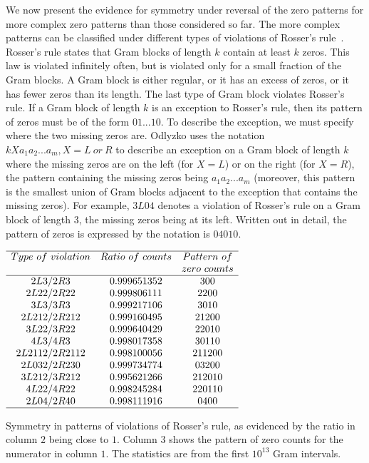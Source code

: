 \documentclass[twoside]{article}
\theoremstyle{definition}
\begin{document}
{We now present the evidence for symmetry under reversal of the zero patterns for more complex zero patterns than those considered so far. The more complex patterns can be classified under different types of violations of Rosser's rule~\cite{gourdon}. Rosser's rule states that Gram blocks of length $k$ contain at least $k$ zeros. This law is violated infinitely often, but is violated only for a small fraction of the Gram blocks. A Gram block is either regular, or it has an excess of zeros, or it has fewer zeros than its length. The last type of Gram block violates Rosser's rule. 
If a Gram block of length {$k$} is an exception to Rosser's rule, then its pattern of zeros must be of the form $01...10$. To describe the exception, we must specify where the two missing zeros are. Odlyzko uses the notation $kXa_1a_2 . . . a_m, X = L~or~R $ 
to describe an exception on a Gram block of length $k$  where the missing zeros are on the left (for $X = L$) or on the right (for $X = R$), the pattern containing the missing zeros being $a_1a_2 . . . a_m$ (moreover, this pattern is the smallest union of Gram blocks adjacent to the exception that contains the missing zeros). For example, $3L04$ denotes a violation of Rosser's rule on a Gram block of length 3, the missing zeros being at its left. Written out in detail, the pattern of zeros is expressed by the notation is $04010$.
  
\begin{table}
\centering \(\begin{array}{ccc}
\hline
Type~of~violation &Ratio~of~counts&Pattern~of\\
&&zero~counts\\
\hline
2L3/2R3 &0.999651352&300\\
2L22/2R22 &0.999806111&2200\\
3L3/3R3 &0.999217106&3010\\
2L212/2R212 &0.999160495&21200\\
3L22/3R22 &0.999640429&22010\\
4L3/4R3 &0.998017358&30110\\
2L2112/2R2112 &0.998100056&211200\\
2L032/2R230 &0.999734774&03200\\
3L212/3R212 &0.995621266&212010\\
4L22/4R22 &0.998245284&220110\\
2L04/2R40 &0.998111916&0400\\
\hline
\end{array}\)
\caption{Symmetry in patterns of violations of Rosser's rule, as evidenced by the ratio in column $2$ being close to $1$.  
Column $3$ shows the pattern of zero counts for the numerator in column $1$. The statistics are from the first $10^{13}$ Gram intervals.} 
\label{tab:vrr}
\end{table}

}
\end{document}
